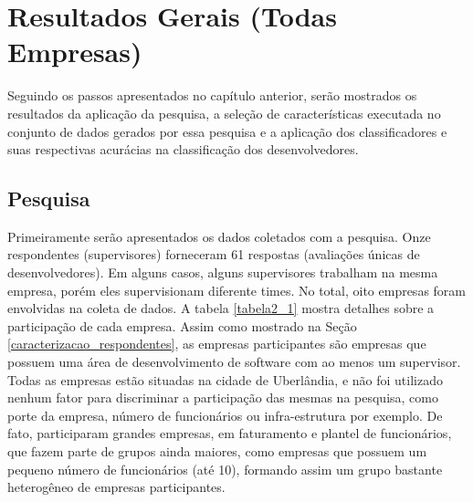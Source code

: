 \chapter[Resultados Gerais]{Resultados Gerais (Todas Empresas)}

Seguindo os passos apresentados no capítulo anterior, serão mostrados os resultados da aplicação da pesquisa, a seleção de características executada no conjunto de dados gerados por essa pesquisa e a aplicação dos classificadores e suas respectivas acurácias na classificação dos desenvolvedores.

\section{Pesquisa}\label{secao4.2}
Primeiramente serão apresentados os dados coletados com a pesquisa. Onze respondentes (supervisores) forneceram 61 respostas (avaliações únicas de desenvolvedores). Em alguns casos, alguns supervisores trabalham na mesma empresa, porém eles supervisionam diferente times. No total, oito empresas foram envolvidas na coleta de dados. A tabela \ref{tabela2_1} mostra detalhes sobre a participação de cada empresa.
Assim como mostrado na Seção \ref{caracterizacao_respondentes}, as empresas participantes são empresas que possuem uma área de desenvolvimento de software com ao menos um supervisor. Todas as empresas estão situadas na cidade de Uberlândia, e não foi utilizado nenhum fator para discriminar a participação das mesmas na pesquisa, como porte da empresa, número de funcionários ou infra-estrutura por exemplo. De fato, participaram grandes empresas, em faturamento e plantel de funcionários, que fazem parte de grupos ainda maiores, como empresas que possuem um pequeno número de funcionários (até 10), formando assim um grupo bastante heterogêneo de empresas participantes.


